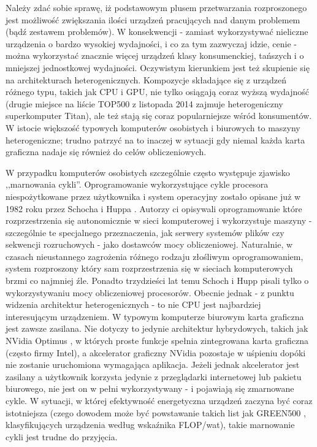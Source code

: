 \documentclass[12pt,a4paper,twoside]{article}
\begin{document}
Należy zdać sobie sprawę, iż podstawowym plusem przetwarzania rozproszonego jest możliwość zwiększania ilości urządzeń pracujących nad danym problemem (bądź zestawem problemów). W konsekwencji - zamiast wykorzystywać nieliczne urządzenia o bardzo wysokiej wydajności, i co za tym zazwyczaj idzie, cenie - można wykorzystać znacznie więcej urządzeń klasy konsumenckiej, tańszych i o mniejszej jednostkowej wydajności. Oczywistym kierunkiem jest też skupienie się na architekturach heterogenicznych. Kompozycje składające się z urządzeń różnego typu, takich jak CPU i GPU, nie tylko osiągają coraz wyższą wydajność (drugie miejsce na liście TOP500 z listopada 2014 \cite{top500} zajmuje heterogeniczny superkomputer Titan), ale też stają się coraz popularniejsze wśród konsumentów. W istocie większość typowych komputerów osobistych i biurowych to maszyny heterogeniczne; trudno patrzyć na to inaczej w sytuacji gdy niemal każda karta graficzna nadaje się również do celów obliczeniowych.

W przypadku komputerów osobistych szczególnie często występuje zjawisko ,,marnowania cykli''. Oprogramowanie wykorzystujące cykle procesora niespożytkowane przez użytkownika i system operacyjny zostało opisane już w 1982 roku przez Schocha i Huppa \cite{worm}. Autorzy ci opisywali oprogramowanie które rozprzestrzenia się autonomicznie w sieci komputerowej i wykorzystuje maszyny - szczególnie te specjalnego przeznaczenia, jak serwery systemów plików czy sekwencji rozruchowych - jako dostawców mocy obliczeniowej. Naturalnie, w czasach nieustannego zagrożenia różnego rodzaju złośliwym oprogramowaniem, system rozproszony który sam rozprzestrzenia się w sieciach komputerowych brzmi co najmniej źle. Ponadto trzydzieści lat temu Schoch i Hupp pisali tylko o wykorzystywaniu mocy obliczeniowej procesorów. Obecnie jednak - z punktu widzenia architektur heterogenicznych - to nie CPU jest najbardziej interesującym urządzeniem. W typowym komputerze biurowym karta graficzna jest zawsze zasilana. Nie dotyczy to jedynie architektur hybrydowych, takich jak NVidia Optimus \cite{optimus}, w których proste funkcje spełnia zintegrowana karta graficzna (często firmy Intel), a akcelerator graficzny NVidia pozostaje w uśpieniu dopóki nie zostanie uruchomiona wymagająca aplikacja. Jeżeli jednak akcelerator jest zasilany a użytkownik korzysta jedynie z przeglądarki internetowej lub pakietu biurowego, nie jest on w pełni wykorzystywany - i pojawiają się zmarnowane cykle. W sytuacji, w której efektywność energetyczna urządzeń zaczyna być coraz istotniejsza (czego dowodem może być powstawanie takich list jak GREEN500 \cite{green500}, klasyfikujących urządzenia według wskaźnika FLOP/wat), takie marnowanie cykli jest trudne do przyjęcia.
\end{document}

